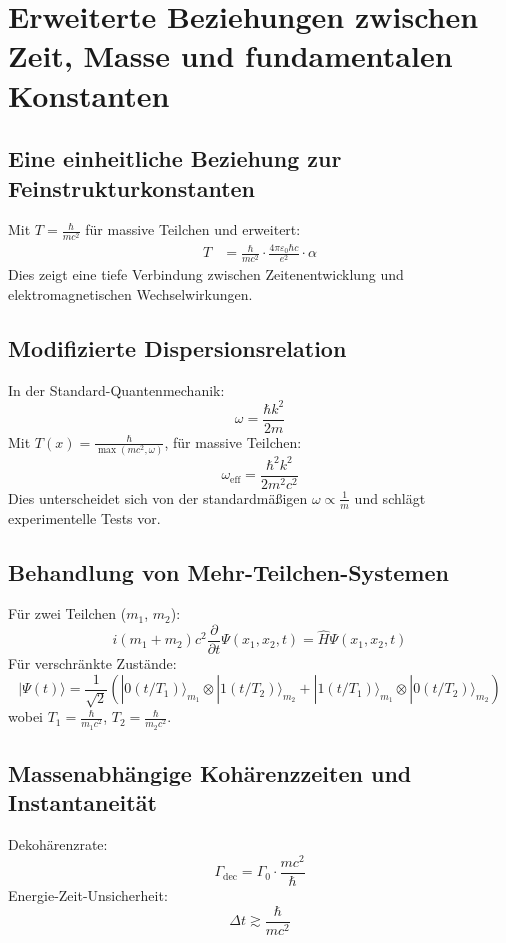 \documentclass{article}
\newcommand{\Tfield}{T(x)}
\begin{document}
	\section{Erweiterte Beziehungen zwischen Zeit, Masse und fundamentalen Konstanten}
	\subsection{Eine einheitliche Beziehung zur Feinstrukturkonstanten}
	Mit \( T = \frac{\hbar}{mc^2} \) für massive Teilchen und erweitert:
	\begin{align}
		T &= \frac{\hbar}{mc^2} \cdot \frac{4\pi\varepsilon_0\hbar c}{e^2} \cdot \alpha
	\end{align}
	Dies zeigt eine tiefe Verbindung zwischen Zeitenentwicklung und elektromagnetischen Wechselwirkungen.
	
	\subsection{Modifizierte Dispersionsrelation}
	In der Standard-Quantenmechanik:
	\begin{equation}
		\omega = \frac{\hbar k^2}{2m}
	\end{equation}
	Mit \( \Tfield = \frac{\hbar}{\max(m c^2, \omega)} \), für massive Teilchen:
	\begin{equation}
		\omega_{\text{eff}} = \frac{\hbar^2 k^2}{2 m^2 c^2}
	\end{equation}
	Dies unterscheidet sich von der standardmäßigen \( \omega \propto \frac{1}{m} \) und schlägt experimentelle Tests vor.
	
	\subsection{Behandlung von Mehr-Teilchen-Systemen}
	Für zwei Teilchen (\( m_1 \), \( m_2 \)):
	\begin{equation}
		i (m_1 + m_2) c^2 \frac{\partial}{\partial t} \Psi(x_1, x_2, t) = \hat{H} \Psi(x_1, x_2, t)
	\end{equation}
	Für verschränkte Zustände:
	\begin{equation}
		|\Psi(t)\rangle = \frac{1}{\sqrt{2}}(|0(t/T_1)\rangle_{m_1} \otimes |1(t/T_2)\rangle_{m_2} + |1(t/T_1)\rangle_{m_1} \otimes |0(t/T_2)\rangle_{m_2})
	\end{equation}
	wobei \( T_1 = \frac{\hbar}{m_1 c^2} \), \( T_2 = \frac{\hbar}{m_2 c^2} \).
	
	\subsection{Massenabhängige Kohärenzzeiten und Instantaneität}
	Dekohärenzrate:
	\begin{equation}
		\Gamma_{\text{dec}} = \Gamma_0 \cdot \frac{m c^2}{\hbar}
	\end{equation}
	Energie-Zeit-Unsicherheit:
	\begin{equation}
		\Delta t \gtrsim \frac{\hbar}{mc^2}
	\end{equation}
	
\end{document}
